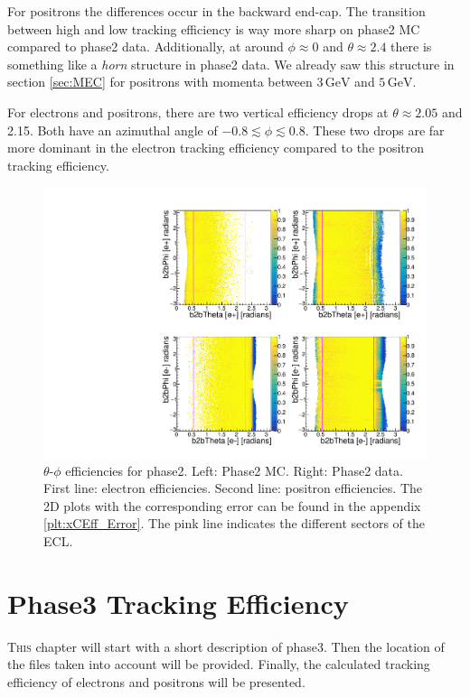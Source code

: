 \documentclass[a4paper,11pt,twosided,final,german,openbib,pdftex,listof=totoc,bibliography=totoc]{scrbook}
\begin{document}
For positrons the differences occur in the backward end-cap. The transition between high and low tracking efficiency is way more sharp on phase2 MC compared to phase2 data. Additionally, at around $\phi \approx 0$ and $\theta \approx 2.4$ there is something like a \textit{horn} structure in phase2 data. We already saw this structure  in section \ref{sec:MEC} for positrons with momenta between $3\,\textrm{GeV}$ and $5\,\textrm{GeV}$.

For electrons and positrons, there are two vertical efficiency drops at $\theta \approx 2.05$ and 2.15. Both have an azimuthal angle of $-0.8 \lesssim \phi \lesssim 0.8$.  These two drops are far more dominant in the electron tracking efficiency compared to the positron tracking efficiency.

\begin{figure}[!htbp]
	\centering
	\includegraphics[width=\textwidth]{Plots/master/xCEffTP_MCData.pdf}
	\caption[$\theta$-$\phi$ Efficiency Plots Phase2]{$\theta$-$\phi$ efficiencies for phase2. Left: Phase2 MC. Right: Phase2 data. First line: electron efficiencies. Second line: positron efficiencies. The 2D plots with the corresponding error can be found in the appendix \ref{plt:xCEff_Error}. The pink line indicates the different sectors of the ECL.}
	\label{plt:xCEff}
\end{figure}

\chapter{Phase3 Tracking Efficiency}
\label{chp:TrackingEfficiencyPhase3}

\lettrine{T}{his} chapter will start with a short description of phase3. Then the location of the files taken into account will be provided. Finally, the calculated tracking efficiency of electrons and positrons will be presented.
\end{document}
